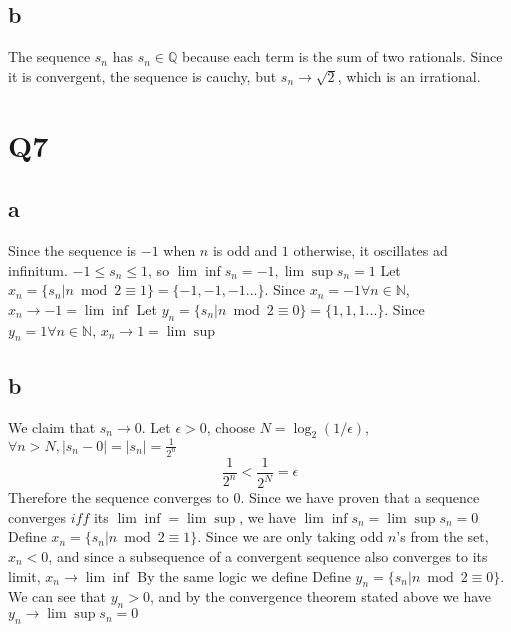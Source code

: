\documentclass[12pt]{article}
\newcommand{\N}{\mathbb{N}}
\newcommand{\Q}{\mathbb{Q}}
\begin{document}
\subsection{b}
The sequence $s_n$ has $s_n \in \Q$ because each term is the sum of two rationals. Since it is convergent, the sequence is cauchy, but $s_n \to \sqrt 2$, which is an irrational.
\newpage


\section{Q7}
\subsection{a}
Since the sequence is $-1$ when $n$ is odd and $1$ otherwise, it oscillates ad infinitum. $-1 \leq s_n \leq 1$, so $\lim \inf s_n = -1, \lim \sup s_n = 1$
\newline
Let $x_n = \{ s_n | n \bmod 2 \equiv 1\} = \{-1, -1, -1 ...\}$. Since $x_n = -1 \forall n \in \N$, $x_n \to -1 = \lim \inf$
\newline
Let $y_n = \{ s_n | n \bmod 2 \equiv 0\} = \{1, 1, 1 ...\}$. Since $y_n = 1 \forall n \in \N$, $x_n \to 1 = \lim \sup$

\subsection{b}
We claim that $s_n \to 0$.
\newline
Let $\epsilon > 0$, choose $N = \log_2(1/\epsilon)$, $\forall n > N, |s_n-0| = |s_n| = \frac{1}{2^n}$
$$\frac{1}{2^n} < \frac{1}{2^N} = \epsilon$$
Therefore the sequence converges to 0.
\newline
Since we have proven that a sequence converges $iff$ its $\lim \inf = \lim \sup$, we have $\lim \inf s_n= \lim \sup s_n = 0$
\newline
Define $x_n = \{ s_n | n \bmod 2 \equiv 1\}$. Since we are only taking odd $n$'s from the set, $x_n < 0$, and since a subsequence of a convergent sequence also converges to its limit, $x_n \to \lim \inf$
\newline
By the same logic we define Define $y_n = \{ s_n | n \bmod 2 \equiv 0\}$. We can see that $y_n > 0$, and by the convergence theorem stated above we have $y_n \to \lim \sup s_n= 0$
\end{document}
